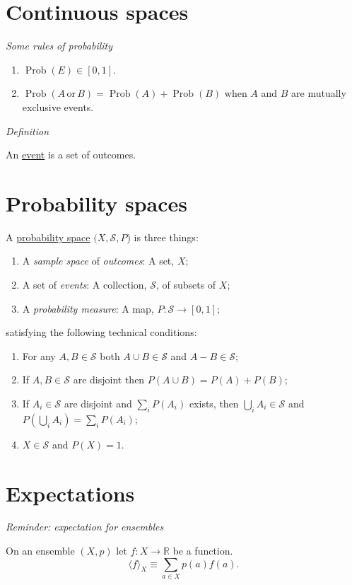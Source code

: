 \documentclass[11pt]{article}
\DeclareMathOperator{\pr}{Prob}
\begin{document}
\newpage
\section*{Continuous spaces}
\label{slide:continuous}
\emph{Some rules of probability}

\begin{enumerate}
\item $\pr(E) \in [0, 1]$.
\item $\pr(A\,\text{or}\,B) = \pr(A) + \pr(B)$ when $A$ and $B$ are mutually
  exclusive events.
\end{enumerate}

\emph{Definition}

An \ul{event} is a set of outcomes.

\newpage
\section*{Probability spaces}
\label{slide:probability}
A \ul{probability space} $(X, \mathcal{S}, P$) is three things:
\begin{enumerate}
\item A \emph{sample space} of \emph{outcomes}: A set, $X$;
\item A set of \emph{events}: A collection, $\mathcal{S}$, of subsets of $X$;
\item A \emph{probability measure}: A map, $P : \mathcal{S}\to[0,1]$;
\end{enumerate}
satisfying the following technical conditions:
\begin{enumerate}
\item For any $A,B\in \mathcal{S}$ both $A\cup B \in\mathcal{S}$ and $A-B\in\mathcal{S}$;
\item If $A,B \in \mathcal{S}$ are disjoint then $P(A \cup B) = P(A)+P(B)$;
\item If $A_i\in\mathcal{S}$ are disjoint and $\sum_i P(A_i)$ exists, then $\bigcup_i A_i\in \mathcal{S}$ and
  $P(\bigcup_i A_i) = \sum_i P(A_i)$;
\item $X\in\mathcal{S}$ and $P(X) = 1$.
\end{enumerate}

\newpage
\section*{Expectations}
\label{slide:expectations}
\emph{Reminder: expectation for ensembles}

On an ensemble $(X, p)$ let $f:X\to\mathbb{R}$ be a function.
\[
\langle f \rangle_X \equiv \sum_{a\in X} p(a) f(a).
\]
\end{document}
